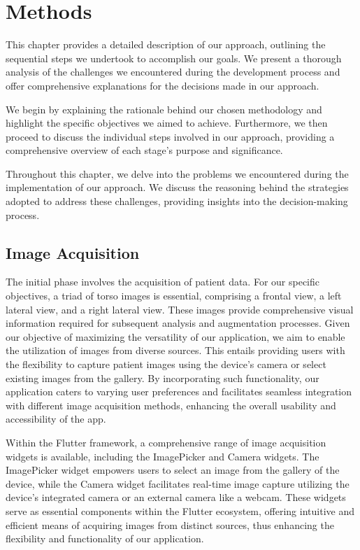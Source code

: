 \chapter{Methods}\label{ch03_methods}

This chapter provides a detailed description of our approach, outlining the sequential steps we undertook to accomplish our goals. We present a thorough analysis of the challenges we encountered during 
the development process and offer comprehensive explanations for the decisions made in our approach.

We begin by explaining the rationale behind our chosen methodology and highlight the specific objectives we aimed to achieve. Furthermore, we then proceed to discuss the individual steps involved in our approach, 
providing a comprehensive overview of each stage's purpose and significance.

Throughout this chapter, we delve into the problems we encountered during the implementation of our approach. We discuss the reasoning behind the strategies adopted to address these challenges, 
providing insights into the decision-making process.

\section{Image Acquisition}

The initial phase involves the acquisition of patient data. For our specific objectives, a triad of torso images is essential, comprising a frontal view, a left lateral view, and a right lateral view. 
These images provide comprehensive visual information required for subsequent analysis and augmentation processes. Given our objective of maximizing the versatility of our application, 
we aim to enable the utilization of images from diverse sources. This entails providing users with the flexibility to capture patient images using the device's camera or select existing images from the gallery. 
By incorporating such functionality, our application caters to varying user preferences and facilitates seamless integration with different image acquisition methods, 
enhancing the overall usability and accessibility of the app.

Within the Flutter framework, a comprehensive range of image acquisition widgets is available, including the ImagePicker and Camera widgets. 
The ImagePicker widget empowers users to select an image from the gallery of the device, while the Camera widget facilitates real-time image capture utilizing the device's integrated camera 
or an external camera like a webcam. These widgets serve as essential components within the Flutter ecosystem, offering intuitive and efficient means of acquiring images from distinct sources, 
thus enhancing the flexibility and functionality of our application.

